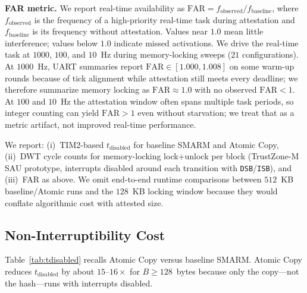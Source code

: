 \documentclass[conference]{IEEEtran}
\newcommand{\tdis}{$t_{\mathrm{disabled}}$\xspace}
\newcommand{\FAR}{FAR\xspace}
\begin{document}
\textbf{FAR metric.}
We report real-time availability as
$\mathrm{FAR}=f_{\mathrm{observed}}/f_{\mathrm{baseline}}$, where
$f_{\mathrm{observed}}$ is the frequency of a high-priority real-time
task during attestation and $f_{\mathrm{baseline}}$ is its frequency
without attestation. Values near $1.0$ mean little interference; values
below $1.0$ indicate missed activations. We drive the real-time task at
$1000$, $100$, and $10$~Hz during memory-locking sweeps ($21$
configurations). At $1000$~Hz, UART summaries report
$\mathrm{FAR}\in[1.000,1.008]$ on some warm-up rounds because of tick
alignment while attestation still meets every deadline; we therefore
summarize memory locking as $\mathrm{FAR}\approx 1.0$ with no observed
$\mathrm{FAR}<1$. At $100$ and $10$~Hz the attestation window often
spans multiple task periods, so integer counting can yield
$\mathrm{FAR}>1$ even without starvation; we treat that as a metric
artifact, not improved real-time performance.

We report: (i)~TIM2-based \tdis for baseline SMARM and Atomic Copy,
(ii)~DWT cycle counts for memory-locking lock+unlock per block (TrustZone-M
SAU prototype, interrupts disabled around each transition with
\texttt{DSB}/\texttt{ISB}), and (iii)~\FAR as above. We omit end-to-end
runtime comparisons between $512$~KB baseline/Atomic runs and the
$128$~KB locking window because they would conflate algorithmic cost
with attested size.

\subsection{Non-Interruptibility Cost}

Table~\ref{tab:tdisabled} recalls Atomic Copy versus baseline SMARM.
Atomic Copy reduces \tdis by about $15$--$16\times$ for
$B\geq 128$~bytes because only the copy---not the hash---runs with
interrupts disabled.
\end{document}
